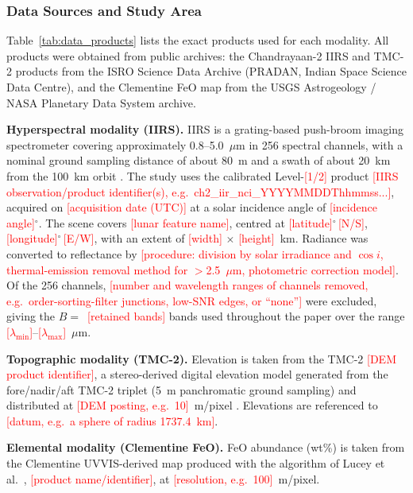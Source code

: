 \documentclass[pdflatex,sn-mathphys-num]{sn-jnl}
\newcommand{\fillin}[1]{\textcolor{red}{[#1]}}
\begin{document}
\subsubsection{Data Sources and Study Area}
\label{sec:data_sources}

Table~\ref{tab:data_products} lists the exact products used for each modality. All products were obtained from public archives: the Chandrayaan-2 IIRS and TMC-2 products from the ISRO Science Data Archive (PRADAN, Indian Space Science Data Centre), and the Clementine FeO map from the USGS Astrogeology / NASA Planetary Data System archive.

\textbf{Hyperspectral modality (IIRS).} IIRS is a grating-based push-broom imaging spectrometer covering approximately 0.8--5.0~$\mu$m in 256 spectral channels, with a nominal ground sampling distance of about 80~m and a swath of about 20~km from the 100~km orbit \cite{Chowdhury2020IIRS}. The study uses the calibrated Level-\fillin{1/2} product \fillin{IIRS observation/product identifier(s), e.g.\ ch2\_iir\_nci\_YYYYMMDDThhmmss...}, acquired on \fillin{acquisition date (UTC)} at a solar incidence angle of \fillin{incidence angle}$^\circ$. The scene covers \fillin{lunar feature name}, centred at \fillin{latitude}$^\circ$\,\fillin{N/S}, \fillin{longitude}$^\circ$\,\fillin{E/W}, with an extent of \fillin{width} $\times$ \fillin{height}~km. Radiance was converted to reflectance by \fillin{procedure: division by solar irradiance and $\cos i$, thermal-emission removal method for $>$2.5~$\mu$m, photometric correction model}. Of the 256 channels, \fillin{number and wavelength ranges of channels removed, e.g.\ order-sorting-filter junctions, low-SNR edges, or ``none''} were excluded, giving the $B=$~\fillin{retained bands} bands used throughout the paper over the range \fillin{$\lambda_{\min}$}--\fillin{$\lambda_{\max}$}~$\mu$m.

\textbf{Topographic modality (TMC-2).} Elevation is taken from the TMC-2 \fillin{DEM product identifier}, a stereo-derived digital elevation model generated from the fore/nadir/aft TMC-2 triplet (5~m panchromatic ground sampling) and distributed at \fillin{DEM posting, e.g.\ 10}~m/pixel \cite{Chowdhury2020TMC}. Elevations are referenced to \fillin{datum, e.g.\ a sphere of radius 1737.4~km}.

\textbf{Elemental modality (Clementine FeO).} FeO abundance (wt\%) is taken from the Clementine UVVIS-derived map produced with the algorithm of Lucey et al.~\cite{Lucey2000}, \fillin{product name/identifier}, at \fillin{resolution, e.g.\ 100}~m/pixel.
\end{document}
